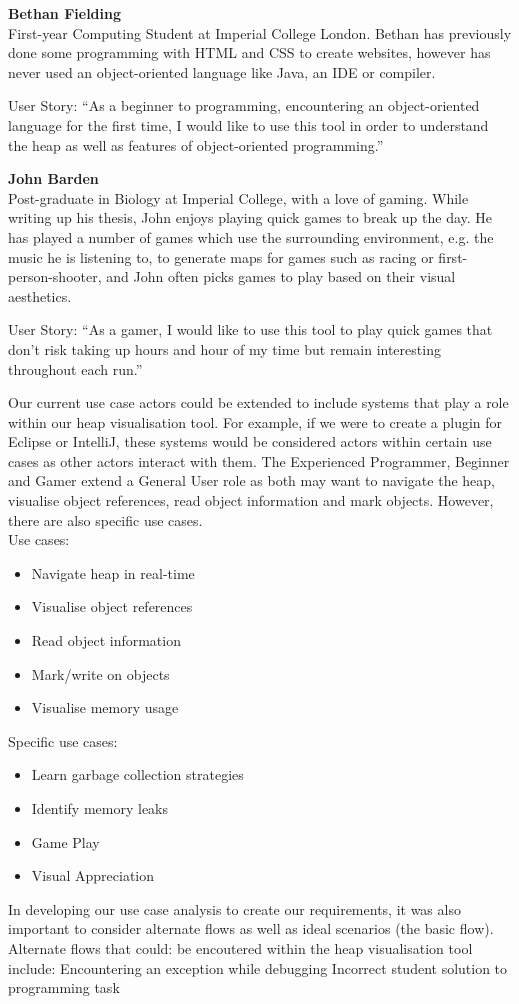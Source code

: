\documentclass[10pt, a4paper]{article}
\begin{document}
\textbf{Bethan Fielding}
\\ First-year Computing Student at Imperial College London. Bethan has previously done some programming with HTML and CSS to create websites, however has never used an object-oriented language like Java, an IDE or compiler.

User Story: “As a beginner to programming, encountering an object-oriented language for the first time, I would like to use this tool in order to understand the heap as well as features of object-oriented programming.”

\textbf{John Barden}
\\ Post-graduate in Biology at Imperial College, with a love of gaming. While writing up his thesis, John enjoys playing quick games to break up the day. He has played a number of games which use the surrounding environment, e.g. the music he is listening to, to generate maps for games such as racing or first-person-shooter, and John often picks games to play based on their visual aesthetics.

User Story: “As a gamer, I would like to use this tool to play quick games that don’t risk taking up hours and hour of my time but remain interesting throughout each run.”

Our current use case actors could be extended to include systems that play a role within our heap visualisation tool. For example, if we were to create a plugin for Eclipse or IntelliJ, these systems would be considered actors within certain use cases as other actors interact with them. The Experienced Programmer, Beginner and Gamer extend a General User role as both may want to navigate the heap, visualise object references, read object information and mark objects. However, there are also specific use cases.
\\

\noindent Use cases:
\begin{itemize}

  \item Navigate heap in real-time
  \item Visualise object references
  \item Read object information
  \item Mark/write on objects 
  \item Visualise memory usage

\end{itemize}

\noindent Specific use cases:
\begin{itemize}

  \item Learn garbage collection strategies
  \item Identify memory leaks
  \item Game Play
  \item Visual Appreciation

\end{itemize}
In developing our use case analysis to create our requirements, it was also important to consider alternate flows as well as ideal scenarios (the basic flow). Alternate flows that could: be encoutered within the heap visualisation tool include:
Encountering an exception while debugging
Incorrect student solution to programming task
\end{document}
